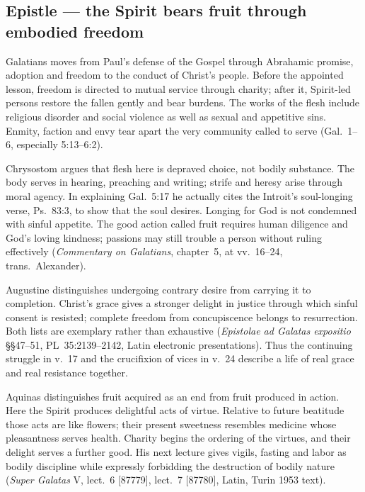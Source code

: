 \pagebreak
\subsection*{Epistle --- the Spirit bears fruit through embodied freedom\enspace{}}\label{epistle-treatment}

Galatians moves from Paul's defense of the Gospel through Abrahamic promise,
adoption and freedom to the conduct of Christ's people. Before the appointed
lesson, freedom is directed to mutual service through charity; after it,
Spirit-led persons restore the fallen gently and bear burdens. The works of
the flesh include religious disorder and social violence as well as sexual
and appetitive sins. Enmity, faction and envy tear apart the very community
called to serve (Gal.~1--6, especially 5:13--6:2).

Chrysostom argues that flesh here is depraved choice, not bodily substance.
The body serves in hearing, preaching and writing; strife and heresy arise
through moral agency. In explaining Gal.~5:17 he actually cites the
Introit's soul-longing verse, Ps.~83:3, to show that the soul desires.
Longing for God is not condemned with sinful appetite. The good action called
fruit requires human diligence and God's loving kindness; passions may still
trouble a person without ruling effectively (\emph{Commentary on Galatians},
chapter~5, at vv.~16--24, trans.~Alexander).

Augustine distinguishes undergoing contrary desire from carrying it to
completion. Christ's grace gives a stronger delight in justice through which
sinful consent is resisted; complete freedom from concupiscence belongs to
resurrection. Both lists are exemplary rather than exhaustive
(\emph{Epistolae ad Galatas expositio} §§47--51, PL~35:2139--2142,
Latin electronic presentations). Thus the continuing struggle in v.~17 and
the crucifixion of vices in v.~24 describe a life of real grace and real
resistance together.

Aquinas distinguishes fruit acquired as an end from fruit produced in action.
Here the Spirit produces delightful acts of virtue. Relative to future
beatitude those acts are like flowers; their present sweetness resembles
medicine whose pleasantness serves health. Charity begins the ordering of
the virtues, and their delight serves a further good. His next lecture gives
vigils, fasting and labor as bodily discipline while expressly forbidding the
destruction of bodily nature (\emph{Super Galatas} V, lect.~6 [87779],
lect.~7 [87780], Latin, Turin 1953 text).

